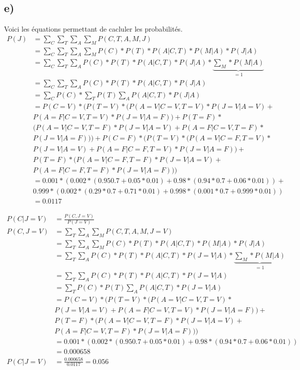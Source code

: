 \documentclass[12pt]{article}
\begin{document}
\subsection{e)}
Voici les équations permettant de cacluler les probabilités.
\begin{equation}
\begin{split}
     P(J) & = \sum_{C} \sum_{T} \sum_{A} \sum_{M} P(C, T, A, M, J) \\
     & = \sum_{C} \sum_{T} \sum_{A} \sum_{M} P(C)*P(T)*P(A|C,T)*P(M|A)*P(J|A) \\
     & = \sum_{C} \sum_{T} \sum_{A} P(C)*P(T)*P(A|C,T)*P(J|A) * \underbrace{\sum_{M} * P(M|A)}_{=1}\\
     & = \sum_{C} \sum_{T} \sum_{A} P(C)*P(T)*P(A|C,T)*P(J|A) \\
     & = \sum_{C} P(C) * \sum_{T} P(T) \sum_{A} P(A|C,T)*P(J|A) \\
     & = P(C=V)*(P(T=V)*(P(A=V|C=V, T=V)*P(J=V|A=V)+ \\
     & P(A=F|C=V, T=V)*P(J=V|A=F))+P(T=F)* \\
     & (P(A=V|C=V, T=F)*P(J=V|A=V)+P(A=F|C=V, T=F)* \\
     & P(J=V|A=F)))+P(C=F)*(P(T=V)*(P(A=V|C=F, T=V)* \\
     & P(J=V|A=V)+P(A=F|C=F, T=V)*P(J=V|A=F))+\\
	 & P(T=F)*(P(A=V|C=F, T=F)*P(J=V|A=V)+ \\
     & P(A=F|C=F, T=F)*P(J=V|A=F)))  \\
	 & = 0.001*(0.002*(0.950.7+0.05*0.01)+0.98*(0.94*0.7+0.06*0.01))+ \\
     &   0.999*(0.002*(0.29*0.7+0.71*0.01)+0.998*(0.001*0.7+0.999*0.01)) \\
     & =0.0117
\end{split}
\end{equation}

\begin{equation}
\begin{split}
     P(C|J=V) & = \frac{P(C,J=V)}{P(J=V)} \\
     P(C, J=V) &= \sum_{T} \sum_{A} \sum_{M} P(C, T, A, M, J=V)\\
     &= \sum_{T} \sum_{A} \sum_{M} P(C)*P(T)*P(A|C,T)*P(M|A)*P(J|A) \\
     & = \sum_{T} \sum_{A} P(C)*P(T)*P(A|C,T)*P(J=V|A) * \underbrace{\sum_{M} * P(M|A)}_{=1}\\
     & = \sum_{T} \sum_{A} P(C)*P(T)*P(A|C,T)*P(J=V|A) \\
     & = \sum_{T} P(C) * P(T) \sum_{A} P(A|C,T)*P(J=V|A) \\
     & = P(C=V)*(P(T=V)*(P(A=V|C=V, T=V)*\\
     & P(J=V|A=V)+P(A=F|C=V, T=V)*P(J=V|A=F))+\\
	 & P(T=F)*(P(A=V|C=V, T=F)*P(J=V|A=V)+\\
     & P(A=F|C=V, T=F)*P(J=V|A=F))) \\
	 & = 0.001*(0.002*(0.950.7+0.05*0.01)+0.98*(0.94*0.7+0.06*0.01)) \\
     & =0.000658 \\
     P(C|J=V) & = \frac{0.000658}{0.0117} = 0.056
\end{split}
\end{equation}
\end{document}
